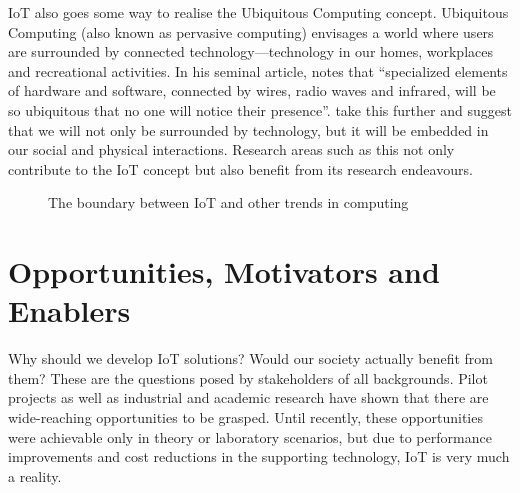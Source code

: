   IoT also goes some way to realise the Ubiquitous Computing concept. Ubiquitous Computing (also known as pervasive computing) envisages a world where users are surrounded by connected technology---technology in our homes, workplaces and recreational activities. In his seminal article, \cite{Weiser:1999} notes that ``specialized elements of hardware and software, connected by wires, radio waves and infrared, will be so ubiquitous that no one will notice their presence''. \citet{Lyytinen:2002} take this further and suggest that we will not only be surrounded by technology, but it will be embedded in our social and physical interactions. Research areas such as this not only contribute to the IoT concept but also benefit from its research endeavours.

  \begin{figure}
    \centering
    \caption{The boundary between IoT and other trends in computing}\label{iotRelationship}
  \end{figure}

  \section{Opportunities, Motivators and Enablers}
  \label{section:enablers}
    Why should we develop IoT solutions? Would our society actually benefit from them? These are the questions posed by stakeholders of all backgrounds. Pilot projects as well as industrial and academic research have shown that there are wide-reaching opportunities to be grasped. Until recently, these opportunities were achievable only in theory or laboratory scenarios, but due to performance improvements and cost reductions in the supporting technology, IoT is very much a reality.

